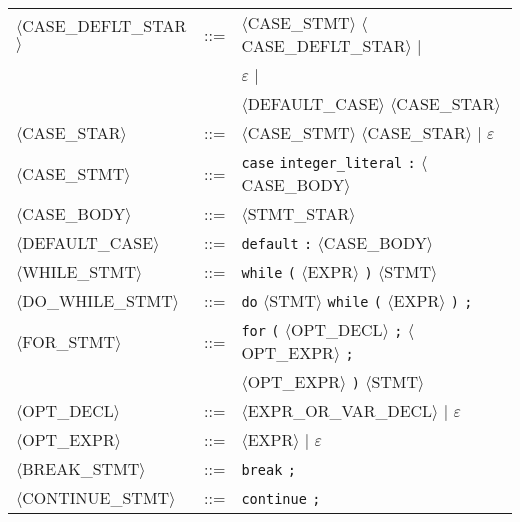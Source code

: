 \begin{footnotesize}
\begin{longtable}{>{\raggedright\arraybackslash}p{4cm}@{\ }>{\raggedright\arraybackslash}p{1.5cm}@{\ }>{\raggedright\arraybackslash}p{8.5cm}}
      $\langle$CASE\_DEFLT\_STAR$\rangle$ & ::= & $\langle$CASE\_STMT$\rangle$ $\langle$CASE\_DEFLT\_STAR$\rangle$ $\mid$ \\
      & & $\varepsilon$ $\mid$ \\
      & & $\langle$DEFAULT\_CASE$\rangle$ $\langle$CASE\_STAR$\rangle$ \\
      
      $\langle$CASE\_STAR$\rangle$ & ::= & $\langle$CASE\_STMT$\rangle$ $\langle$CASE\_STAR$\rangle$ $\mid$ $\varepsilon$ \\
      
      $\langle$CASE\_STMT$\rangle$ & ::= & \texttt{case} \texttt{integer\_literal} \texttt{:} $\langle$CASE\_BODY$\rangle$ \\
      
      $\langle$CASE\_BODY$\rangle$ & ::= & $\langle$STMT\_STAR$\rangle$ \\
      
      $\langle$DEFAULT\_CASE$\rangle$ & ::= & \texttt{default} \texttt{:} $\langle$CASE\_BODY$\rangle$ \\
      
      $\langle$WHILE\_STMT$\rangle$ & ::= & \texttt{while} \texttt{(} $\langle$EXPR$\rangle$ \texttt{)} $\langle$STMT$\rangle$ \\
      
      $\langle$DO\_WHILE\_STMT$\rangle$ & ::= & \texttt{do} $\langle$STMT$\rangle$ \texttt{while} \texttt{(} $\langle$EXPR$\rangle$ \texttt{)} \texttt{;} \\
      
      $\langle$FOR\_STMT$\rangle$ & ::= & \texttt{for} \texttt{(} $\langle$OPT\_DECL$\rangle$ \texttt{;} $\langle$OPT\_EXPR$\rangle$ \texttt{;} \\
      & & $\langle$OPT\_EXPR$\rangle$ \texttt{)} $\langle$STMT$\rangle$ \\
      
      $\langle$OPT\_DECL$\rangle$ & ::= & $\langle$EXPR\_OR\_VAR\_DECL$\rangle$ $\mid$ $\varepsilon$ \\
      
      $\langle$OPT\_EXPR$\rangle$ & ::= & $\langle$EXPR$\rangle$ $\mid$ $\varepsilon$ \\
      
      $\langle$BREAK\_STMT$\rangle$ & ::= & \texttt{break} \texttt{;} \\
      
      $\langle$CONTINUE\_STMT$\rangle$ & ::= & \texttt{continue} \texttt{;} \\
      

\end{longtable}
\end{footnotesize}
